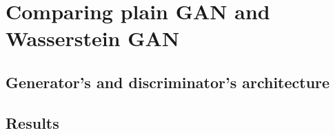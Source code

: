 \section{Comparing plain GAN and Wasserstein GAN}

\subsection{Generator's and discriminator's architecture}
\subsection{Results}